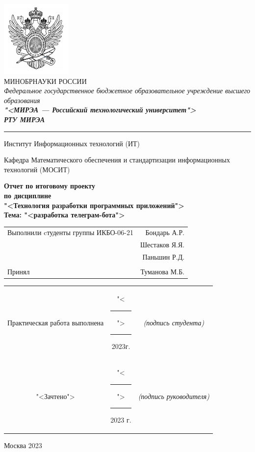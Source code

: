 \begin{center}
	\includegraphics[scale=0.5]{./res/logo.png}\\

	МИНОБРНАУКИ РОССИИ\\
	\textit{Федеральное государственное бюджетное
	образовательное учреждение высшего образования}\\
	\textbf{\textit{"<МИРЭА --- Российский технологический
	университет">}}\\
	{\large\bfseries\itshape РТУ МИРЭА}\\

	\bigskip \hrule \smallskip

	Институт Информационных технологий (ИТ)\\

	\vfill

	Кафедра Математического обеспечения и стандартизации информационных
		технологий (МОСИТ)\\

	\vfill

	\textbf{
		Отчет по итоговому проекту\\
		по дисциплине\\
		"<Технология разработки программных приложений">\\
		Тема: "<разработка телеграм-бота">\\
	}

	\vfill
	\vfill

	\begin{small}
		\begin{tabular}{lr}
			Выполнили cтуденты группы ИКБО-06-21 & Бондарь А.Р.\\
			& Шестаков Я.Я.\\
			& Паньшин Р.Д.\\\\
			Принял & Туманова М.Б.\\
		\end{tabular}
	\end{small}

	\vfill

	\begin{footnotesize}
		\begin{tabular}{ccc}
			Практическая  работа выполнена
			& "<\rule{1ex}{.5pt}">\rule{7ex}{.5pt}2023г.
			& \textit{(подпись студента)}\\
			"<Зачтено"> 
			& "<\rule{1ex}{.5pt}">\rule{7ex}{.5pt}2023 г.
			& \textit{(подпись руководителя)}\\
		\end{tabular}
	\end{footnotesize}

	\vfill

	Москва 2023
\end{center}

\thispagestyle{empty}

